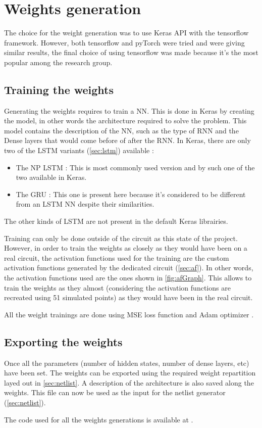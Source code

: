 \section{Weights generation}
\label{sec:weigen}

The choice for the weight generation was to use Keras API with the tensorflow framework. However, both tensorflow and pyTorch were tried and were giving similar results, the final choice of using tensorflow was made because it's the most popular among the research group.%

\subsection{Training the weights}

Generating the weights requires to train a \ac{NN}. This is done in Keras by creating the model, in other words the architecture required to solve the problem. This model contains the description of the \ac{NN}, such as the type of \ac{RNN} and the Dense layers that would come before of after the \ac{RNN}. In Keras, there are only two of the \ac{LSTM} variants (\cref{sec:lstm}) available :

\begin{itemize}
  \item The \ac{NP} \ac{LSTM} : This is most commonly used version and by such one of the two available in Keras.
  \item The \ac{GRU} : This one is present here because it's considered to be different from an \ac{LSTM} \ac{NN} despite their similarities.
\end{itemize}

The other kinds of \ac{LSTM} are not present in the default Keras librairies.

Training can only be done outside of the circuit as this state of the project. However, in order to train the weights as closely as they would have been on a real circuit, the activation functions used for the training are the custom activation functions generated by the dedicated circuit (\cref{sec:af}). In other words, the activation functions used are the ones shown in \cref{fig:afGraph}. This allows to train the weights as they almost (considering the activation functions are recreated using 51 simulated points) as they would have been in the real circuit.

All the weight trainings are done using \ac{MSE} loss function and Adam optimizer \cite{adamOpti}.

\subsection{Exporting the weights}

Once all the parameters (number of hidden states, number of dense layers, etc) have been set. The weights can be exported using the required weight repartition layed out in \cref{sec:netlist}. A description of the architecture is also saved along the weights. This file can now be used as the input for the netlist generator (\cref{sec:netlist}).

The code used for all the weights generations is available at \cite{lstmWei}. %
